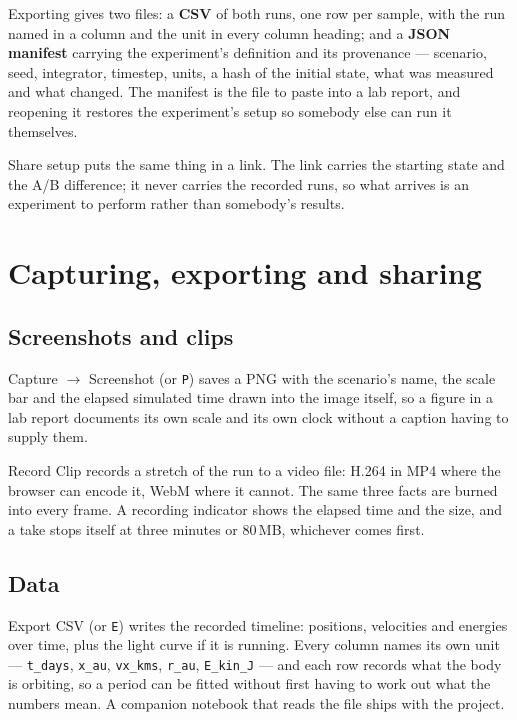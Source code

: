 \documentclass[11pt,a4paper]{article}
\newcommand{\ui}[1]{\textsf{#1}}
\newcommand{\key}[1]{\texttt{#1}}
\begin{document}
Exporting gives two files: a \textbf{CSV} of both runs, one row per sample,
with the run named in a column and the unit in every column heading; and a
\textbf{JSON manifest} carrying the experiment's definition and its
provenance --- scenario, seed, integrator, timestep, units, a hash of the
initial state, what was measured and what changed. The manifest is the file to
paste into a lab report, and reopening it restores the experiment's setup so
somebody else can run it themselves.

\ui{Share setup} puts the same thing in a link. The link carries the starting
state and the A/B difference; it never carries the recorded runs, so what
arrives is an experiment to perform rather than somebody's results.

\section{Capturing, exporting and sharing}

\subsection{Screenshots and clips}

\ui{Capture} $\rightarrow$ \ui{Screenshot} (or \key{P}) saves a PNG with the
scenario's name, the scale bar and the elapsed simulated time drawn into the
image itself, so a figure in a lab report documents its own scale and its own
clock without a caption having to supply them.

\ui{Record Clip} records a stretch of the run to a video file: H.264 in MP4 where
the browser can encode it, WebM where it cannot. The same three facts are burned
into every frame. A recording indicator shows the elapsed time and the size, and
a take stops itself at three minutes or 80\,MB, whichever comes first.

\subsection{Data}

\ui{Export CSV} (or \key{E}) writes the recorded timeline: positions, velocities
and energies over time, plus the light curve if it is running. Every column names
its own unit --- \texttt{t\_days}, \texttt{x\_au}, \texttt{vx\_kms},
\texttt{r\_au}, \texttt{E\_kin\_J} --- and each row records what the body is
orbiting, so a period can be fitted without first having to work out what the
numbers mean. A companion notebook that reads the file ships with the project.
\end{document}

